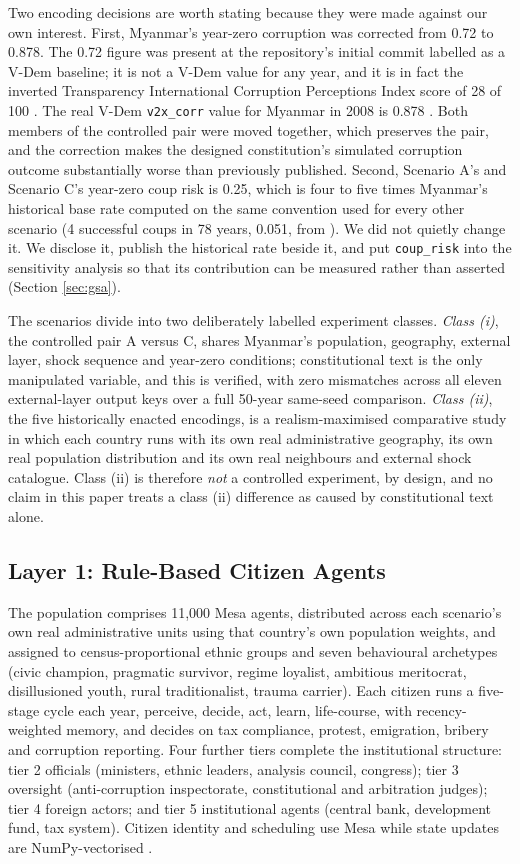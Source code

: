 \documentclass{ieeeaccess}
\begin{document}
Two encoding decisions are worth stating because they were made against
our own interest. First, Myanmar's year-zero corruption was corrected
from 0.72 to 0.878. The 0.72 figure was present at the repository's
initial commit labelled as a V-Dem baseline; it is not a V-Dem value for
any year, and it is in fact the inverted Transparency International
Corruption Perceptions Index score of 28 of 100
\cite{ti2024cpi}. The real V-Dem \texttt{v2x\_corr} value for Myanmar in
2008 is 0.878 \cite{coppedge2026vdem16}. Both members of the controlled
pair were moved together, which preserves the pair, and the correction
makes the designed constitution's simulated corruption outcome
substantially worse than previously published. Second, Scenario A's and
Scenario C's year-zero coup risk is 0.25, which is four to five times
Myanmar's historical base rate computed on the same convention used for
every other scenario (4 successful coups in 78 years, 0.051, from
\cite{powell2011global}). We did not quietly change it. We disclose it,
publish the historical rate beside it, and put \texttt{coup\_risk} into
the sensitivity analysis so that its contribution can be measured rather
than asserted (Section \ref{sec:gsa}).

The scenarios divide into two deliberately labelled experiment classes.
\emph{Class (i)}, the controlled pair A versus C, shares Myanmar's
population, geography, external layer, shock sequence and year-zero
conditions; constitutional text is the only manipulated variable, and
this is verified, with zero mismatches across all eleven external-layer
output keys over a full 50-year same-seed comparison. \emph{Class
(ii)}, the five historically enacted encodings, is a realism-maximised
comparative study in which each country runs with its own real
administrative geography, its own real population distribution and its
own real neighbours and external shock catalogue. Class (ii) is
therefore \emph{not} a controlled experiment, by design, and no claim in
this paper treats a class (ii) difference as caused by constitutional
text alone.

\subsection{Layer 1: Rule-Based Citizen Agents}
The population comprises 11,000 Mesa agents, distributed across each
scenario's own real administrative units using that country's own
population weights, and assigned to census-proportional ethnic groups
and seven behavioural archetypes (civic champion, pragmatic survivor,
regime loyalist, ambitious meritocrat, disillusioned youth, rural
traditionalist, trauma carrier). Each citizen runs a five-stage cycle
each year, perceive, decide, act, learn, life-course, with
recency-weighted memory, and decides on tax compliance, protest,
emigration, bribery and corruption reporting. Four further tiers
complete the institutional structure: tier 2 officials (ministers,
ethnic leaders, analysis council, congress); tier 3 oversight
(anti-corruption inspectorate, constitutional and arbitration judges);
tier 4 foreign actors; and tier 5 institutional agents (central bank,
development fund, tax system). Citizen identity and scheduling use Mesa
while state updates are NumPy-vectorised \cite{harris2020array}.
\end{document}

